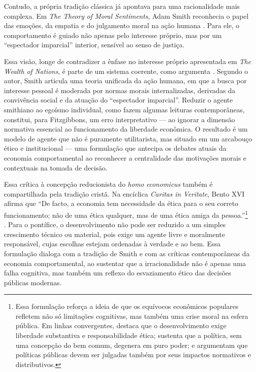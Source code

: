 Contudo, a própria tradição clássica já apontava para uma racionalidade mais complexa. Em \textit{The Theory of Moral Sentiments}, Adam Smith reconhecia o papel das emoções, da empatia e do julgamento moral na ação humana \cite{smith1759-theory-of-moral-sentiments}. Para ele, o comportamento é guiado não apenas pelo interesse próprio, mas por um ``espectador imparcial'' interior, sensível ao senso de justiça.

Essa visão, longe de contradizer a ênfase no interesse próprio apresentada em \textit{The Wealth of Nations}, é parte de um sistema coerente, como argumenta . Segundo o autor, Smith articula uma teoria unificada da ação humana, em que a busca por interesse pessoal é moderada por normas morais internalizadas, derivadas da convivência social e da atuação do ``espectador imparcial''. Reduzir o agente smithiano ao egoísmo individual, como fazem algumas leituras contemporâneas, constitui, para Fitzgibbons, um erro interpretativo — ao ignorar a dimensão normativa essencial ao funcionamento da liberdade econômica. O resultado é um modelo de agente que não é puramente utilitarista, mas situado em um arcabouço ético e institucional — uma formulação que antecipa os debates atuais da economia comportamental ao reconhecer a centralidade das motivações morais e contextuais na tomada de decisão.

Essa crítica à concepção reducionista do \textit{homo economicus} também é compartilhada pela tradição cristã. Na encíclica \textit{Caritas in Veritate}, Bento XVI afirma que ``De facto, a economia tem necessidade da ética para o seu correto funcionamento; não de uma ética qualquer, mas de uma ética amiga da pessoa.''\footnote{Essa formulação reforça a ideia de que os equívocos econômicos populares refletem não só limitações cognitivas, mas também uma crise moral na esfera pública. Em linhas convergentes,  destaca que o desenvolvimento exige liberdade substantiva e responsabilidade ética;  sustenta que a política, sem uma concepção do bem comum, degenera em puro poder; e  argumentam que políticas públicas devem ser julgadas também por seus impactos normativos e distributivos.}
\cite[\S ~45]{bento2009caritas}. Para o pontífice, o desenvolvimento não pode ser reduzido a um simples crescimento técnico ou material, pois exige um agente livre e moralmente responsável, cujas escolhas estejam ordenadas à verdade e ao bem. Essa formulação dialoga com a tradição de Smith e com as críticas contemporâneas da economia comportamental, ao sustentar que a irracionalidade não é apenas uma falha cognitiva, mas também um reflexo do esvaziamento ético das decisões públicas modernas.

